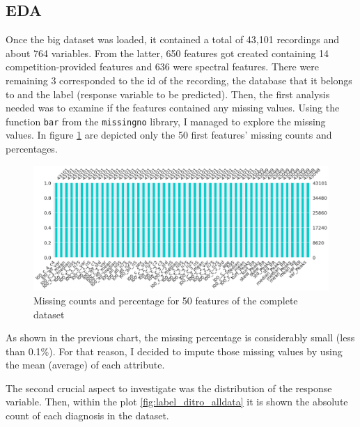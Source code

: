 \subsection{EDA}

Once the big dataset was loaded, it contained a total of 43,101 recordings and about 764 variables. From the latter, 650 features got created containing 14 competition-provided features and 636 were spectral features. There were remaining 3 corresponded to the id of the recording, the database that it belongs to and the label (response variable to be predicted). Then, the first analysis needed was to examine if the features contained any missing values. Using the function \texttt{bar} from the \texttt{missingno} library, I managed to explore the missing values. In figure \ref{fig:eda_missing} are depicted only the 50 first features' missing counts and percentages.

\begin{figure}[H]
\centering
\includegraphics[scale=0.30]{img/eda_missing.png}
\caption{Missing counts and percentage for 50 features of the complete dataset}
\label{fig:eda_missing}
\end{figure}

As shown in the previous chart, the missing percentage is considerably small (less than 0.1\%). For that reason, I decided to impute those missing values by using the mean (average) of each attribute. 

The second crucial aspect to investigate was the distribution of the response variable. Then, within the plot \ref{fig:label_ditro_alldata} it is shown the absolute count of each diagnosis in the dataset.

